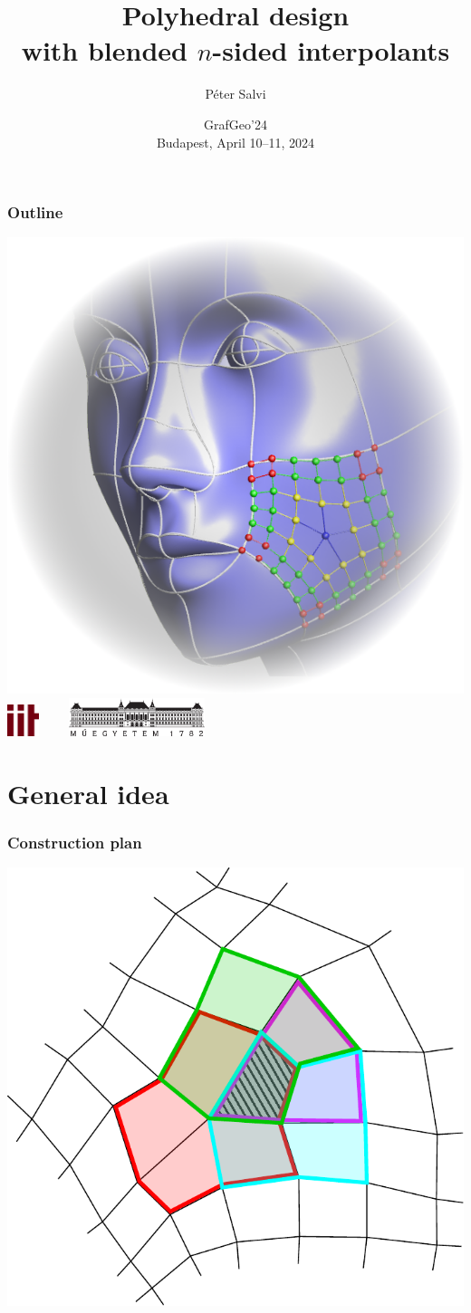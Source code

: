 \documentclass{beamer}
\title{Polyhedral design\\with blended $n$-sided interpolants}
\author{P\'eter Salvi}
\institute{Budapest University of Technology and Economics}
\date{GrafGeo'24\\\vspace{1em}Budapest, April 10--11, 2024}
\begin{document}
\begin{frame}
  \titlepage
\end{frame}

\begin{frame}
  \frametitle{Outline}
  \hfill\includegraphics[width=.35\textwidth]{images/face-gradient.png}\\
  \vspace{-10em}
  \tableofcontents
  \centering
  \includegraphics[height=2.5em]{images/iit.png}$\qquad$
  \includegraphics[height=3em]{images/bme.jpg}
\end{frame}

\section{General idea}

\begin{frame}
  \frametitle{Construction plan}
  \centering
  \includegraphics[width=.7\textwidth]{images/idea.pdf}
\end{frame}
\end{document}
